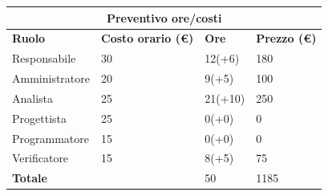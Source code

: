 \documentclass[a4paper, 12pt]{article}
\begin{document}
\begin{center}
	\begin{tabularx}{\textwidth}{|X|X|X|X|}
		\hline
		\multicolumn{4}{|c|}{\textbf{Preventivo ore/costi}}                                      \\
		\hline
		\hline
		\textbf{Ruolo}  & \textbf{Costo orario (\euro)} & \textbf{Ore} & \textbf{Prezzo (\euro)} \\
		\hline
		Responsabile    & 30                            & 12(+6)       & 180                     \\
		\hline
		Amministratore  & 20                            & 9(+5)        & 100                      \\
		\hline
		Analista        & 25                            & 21(+10)       & 250                     \\
		\hline
		Progettista     & 25                            & 0(+0)        & 0                       \\
		\hline
		Programmatore   & 15                            & 0(+0)        & 0                       \\
		\hline
		Verificatore    & 15                            & 8(+5)        & 75                      \\
		\hline
		\hline
		\textbf{Totale} &                               & 50           & 1185                    \\
		\hline
	\end{tabularx}\\[8pt]
	\mbox{}\\
\end{center}
\end{document}
